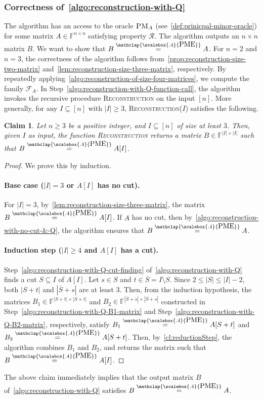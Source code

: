 \documentclass[11pt,letterpaper]{article}
\newcommand{\comp}[1]{\overline{#1}}
\newcommand{\F}{\mathbb{F}}
\newtheorem{claim}{Claim}[section]
\newcommand{\PME}{\stackrel{\mathclap{\scalebox{.4}{\mbox{PME}}}}{=}}
\newcommand{\prop}{\mathcal{R}}
\newcommand{\PMoracle}[1]{\textsc{PM}_{#1}}
\newcommand{\submatrixfamily}[1]{\mathcal{F}_{#1}}
\begin{document}
{{{\subsubsection{Correctness of~\cref{algo:reconstruction-with-Q}}
The algorithm has an access to the oracle $\PMoracle{A}$ (see~\cref{def:prinicpal-minor-oracle}) for some matrix $A\in\F^{n\times n}$ satisfying property $\prop$. The algorithm outputs an $n\times n$ matrix $B$. We want to show that $B\PME A$. For $n=2$ and $n=3$, the correctness of the algorithm follows from~\cref{prop:reconstruction-size-two-matrix} and~\cref{lem:reconstruction-size-three-matrix}, respectively. By repeatedly applying~\cref{algo:reconstruction-of-size-four-matrices}, we compute the family $\submatrixfamily{A}$. In Step~\ref{algo:reconstruction-with-Q-function-call}, the algorithm invokes the recursive procedure \textsc{Reconstruction} on the input $[n]$. More generally, for any $I\subseteq [n]$ with $|I|\geq 3$, \textsc{Reconstruction}($I$) satisfies the following.

\begin{claim}
\label{clm:reconstruction-with-Q-recursion}
Let $n\geq 3$ be a positive integer, and $I\subseteq [n]$ of size at least $3$. Then, given $I$ as input, the function \textsc{Reconstruction} returns a matrix $B\in \F^{|I|\times |I|}$ such that $B\PME A[I]$.
\end{claim}
\begin{proof}
We prove this by induction. 

\paragraph*{Base case ($|I|=3$ or $A[I]$ has no cut).} For $|I|=3$,  by~\cref{lem:reconstruction-size-three-matrix}, the matrix $B\PME A[I]$. If $A$ has no cut, then by~\cref{algo:reconstruction-with-no-cut-&-Q}, the algorithm ensures that $B\PME A$. 
\paragraph*{Induction step ($|I|\geq4$ and $A[I]$ has a cut).} Step~\ref{algo:reconstruction-with-Q-cut-finding} of~\cref{algo:reconstruction-with-Q} finds a cut $S\subseteq I$ of $A[I]$. Let $s\in S$ and $t\in \comp{S}=I\setminus S$. Since $2\leq |S|\leq |I|-2$, both $|S+t|$ and $|\comp{S}+s|$ are at least $3$. Then, from the induction hypothesis, the matrices $B_1\in \F^{|S+t|\times |S+t|}$ and $B_2\in\F^{|\comp{S}+s|\times |\comp{S}+s|}$ constructed in Step~\ref{algo:reconstruction-with-Q-B1-matrix} and Step~\ref{algo:reconstruction-with-Q-B2-matrix}, respectively, satisfy $B_1\PME A[S+t]$ and $B_2\PME A[S+t]$. Then, by~\cref{cl:reductionStep}, the algorithm combines $B_1$ and $B_2$, and returns the matrix such that $B\PME A[I]$.  
\end{proof}
The above claim immediately implies that the output matrix $B$ of~\cref{algo:reconstruction-with-Q} satisfies $B\PME A$.


}}}
\end{document}

